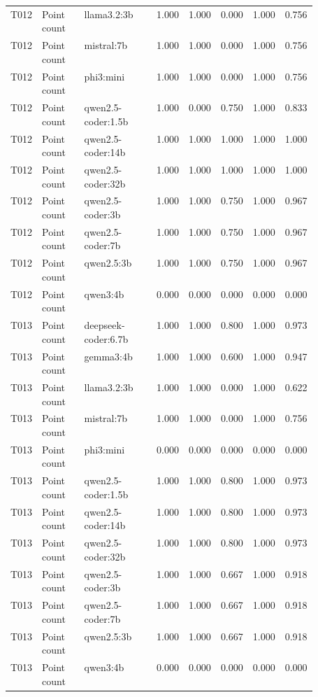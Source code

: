 \begin{longtable}{p{0.08\linewidth}p{0.16\linewidth}p{0.27\linewidth}rrrrr}
T012 & Point count & llama3.2:3b & 1.000 & 1.000 & 0.000 & 1.000 & 0.756 \\
T012 & Point count & mistral:7b & 1.000 & 1.000 & 0.000 & 1.000 & 0.756 \\
T012 & Point count & phi3:mini & 1.000 & 1.000 & 0.000 & 1.000 & 0.756 \\
T012 & Point count & qwen2.5-coder:1.5b & 1.000 & 0.000 & 0.750 & 1.000 & 0.833 \\
T012 & Point count & qwen2.5-coder:14b & 1.000 & 1.000 & 1.000 & 1.000 & 1.000 \\
T012 & Point count & qwen2.5-coder:32b & 1.000 & 1.000 & 1.000 & 1.000 & 1.000 \\
T012 & Point count & qwen2.5-coder:3b & 1.000 & 1.000 & 0.750 & 1.000 & 0.967 \\
T012 & Point count & qwen2.5-coder:7b & 1.000 & 1.000 & 0.750 & 1.000 & 0.967 \\
T012 & Point count & qwen2.5:3b & 1.000 & 1.000 & 0.750 & 1.000 & 0.967 \\
T012 & Point count & qwen3:4b & 0.000 & 0.000 & 0.000 & 0.000 & 0.000 \\
T013 & Point count & deepseek-coder:6.7b & 1.000 & 1.000 & 0.800 & 1.000 & 0.973 \\
T013 & Point count & gemma3:4b & 1.000 & 1.000 & 0.600 & 1.000 & 0.947 \\
T013 & Point count & llama3.2:3b & 1.000 & 1.000 & 0.000 & 1.000 & 0.622 \\
T013 & Point count & mistral:7b & 1.000 & 1.000 & 0.000 & 1.000 & 0.756 \\
T013 & Point count & phi3:mini & 0.000 & 0.000 & 0.000 & 0.000 & 0.000 \\
T013 & Point count & qwen2.5-coder:1.5b & 1.000 & 1.000 & 0.800 & 1.000 & 0.973 \\
T013 & Point count & qwen2.5-coder:14b & 1.000 & 1.000 & 0.800 & 1.000 & 0.973 \\
T013 & Point count & qwen2.5-coder:32b & 1.000 & 1.000 & 0.800 & 1.000 & 0.973 \\
T013 & Point count & qwen2.5-coder:3b & 1.000 & 1.000 & 0.667 & 1.000 & 0.918 \\
T013 & Point count & qwen2.5-coder:7b & 1.000 & 1.000 & 0.667 & 1.000 & 0.918 \\
T013 & Point count & qwen2.5:3b & 1.000 & 1.000 & 0.667 & 1.000 & 0.918 \\
T013 & Point count & qwen3:4b & 0.000 & 0.000 & 0.000 & 0.000 & 0.000 \\

\end{longtable}
